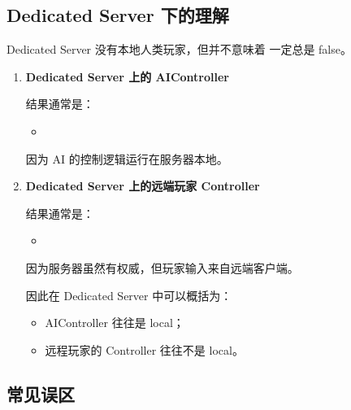 \subsection{Dedicated Server 下的理解}

Dedicated Server 没有本地人类玩家，但并不意味着  一定总是 false。

\begin{enumerate}
	\item \textbf{Dedicated Server 上的 AIController}
	
	结果通常是：
	
	\begin{itemize}
		\item {}
	\end{itemize}
	因为 AI 的控制逻辑运行在服务器本地。
	
	\item \textbf{Dedicated Server 上的远端玩家 Controller}
	
	结果通常是：
	\begin{itemize}
		\item {}
	\end{itemize}
	
	因为服务器虽然有权威，但玩家输入来自远端客户端。
	
	因此在 Dedicated Server 中可以概括为：
	
	\begin{itemize}
		\item AIController 往往是 local；
		\item 远程玩家的 Controller 往往不是 local。
	\end{itemize}
\end{enumerate}

\subsection{常见误区}

